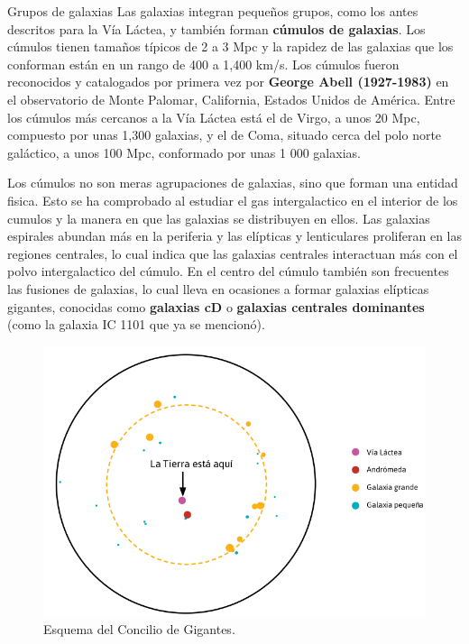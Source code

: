 \documentclass[12pt,addpoints]{guia}
\begin{document}
\begin{sectionbox}{Grupos de galaxias}
    Las galaxias integran pequeños grupos, como los antes
    descritos para la Vía Láctea, y también forman \textbf{cúmulos
    de galaxias}. Los cúmulos tienen tamaños típicos de 2 a
    3 Mpc y la rapidez de las galaxias que los conforman
    están en un rango de 400 a 1,400 km/s. Los cúmulos fueron reconocidos y catalogados por primera vez por
    \textbf{George Abell (1927-1983)} en el observatorio de Monte
    Palomar, California, Estados Unidos de América.
    Entre los cúmulos más cercanos a la Vía Láctea está el
    de Virgo, a unos 20 Mpc, compuesto por unas 1,300 galaxias,
    y el de Coma, situado cerca del polo norte galáctico, a unos 100 Mpc, conformado por unas 1 000 galaxias.

    

    Los cúmulos no son meras agrupaciones de galaxias, sino que forman una entidad fisica. Esto se ha comprobado al estudiar el gas intergalactico en el interior de los cumulos y la manera en que las galaxias se distribuyen en ellos. Las galaxias espirales abundan más en la periferia y las elípticas y lenticulares proliferan en las regiones centrales, lo cual indica que las galaxias centrales interactuan más con el polvo intergalactico del cúmulo. En el centro del \label{087b_a}cúmulo también son frecuentes las fusiones de galaxias, lo cual lleva en ocasiones a formar galaxias elípticas gigantes, conocidas como \textbf{galaxias cD} o \textbf{galaxias centrales dominantes} (como la galaxia IC 1101 que ya se mencionó).
    \begin{figure}
        \centering
        \includegraphics[width=\linewidth]{../images/20230520234809}
        \caption{Esquema del Concilio de Gigantes.}
        \label{fig:20230520234809}
    \end{figure}


\end{sectionbox}
\end{document}
